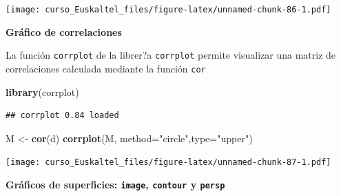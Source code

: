 \documentclass[]{book}
\newenvironment{Shaded}{\begin{snugshade}}{\end{snugshade}}
\newcommand{\KeywordTok}[1]{\textcolor[rgb]{0.13,0.29,0.53}{\textbf{#1}}}
\newcommand{\DataTypeTok}[1]{\textcolor[rgb]{0.13,0.29,0.53}{#1}}
\newcommand{\DecValTok}[1]{\textcolor[rgb]{0.00,0.00,0.81}{#1}}
\newcommand{\StringTok}[1]{\textcolor[rgb]{0.31,0.60,0.02}{#1}}
\newcommand{\OtherTok}[1]{\textcolor[rgb]{0.56,0.35,0.01}{#1}}
\newcommand{\OperatorTok}[1]{\textcolor[rgb]{0.81,0.36,0.00}{\textbf{#1}}}
\newcommand{\NormalTok}[1]{#1}
\begin{document}
\texttt{[image: curso\_Euskaltel\_files/figure-latex/unnamed-chunk-86-1.pdf]}

\textbf{Gráfico de correlaciones}

La función \texttt{corrplot} de la librer?a \texttt{corrplot} permite
visualizar una matriz de correlaciones calculada mediante la función
\texttt{cor}

\begin{Shaded}
\begin{Highlighting}[]
\KeywordTok{library}\NormalTok{(corrplot)}
\end{Highlighting}
\end{Shaded}

\begin{verbatim}
## corrplot 0.84 loaded
\end{verbatim}

\begin{Shaded}
\begin{Highlighting}[]
\NormalTok{M <-}\StringTok{ }\KeywordTok{cor}\NormalTok{(d)}
\KeywordTok{corrplot}\NormalTok{(M, }\DataTypeTok{method=}\StringTok{"circle"}\NormalTok{,}\DataTypeTok{type=}\StringTok{"upper"}\NormalTok{)}
\end{Highlighting}
\end{Shaded}

\texttt{[image: curso\_Euskaltel\_files/figure-latex/unnamed-chunk-87-1.pdf]}

\textbf{Gráficos de superficies: \texttt{image}, \texttt{contour} y
\texttt{persp}}

\begin{Shaded}
\end{Shaded}
\end{document}
